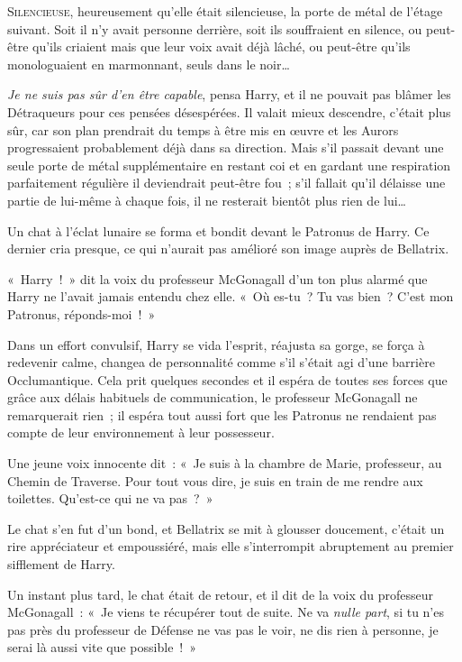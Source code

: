 
\lettrine{S}{ilencieuse}, heureusement qu'elle était silencieuse, la porte de métal de l'étage suivant. Soit il n'y avait personne derrière, soit ils souffraient en silence, ou peut-être qu'ils criaient mais que leur voix avait déjà lâché, ou peut-être qu'ils monologuaient en marmonnant, seuls dans le noir…

\emph{Je ne suis pas sûr d'en être capable}, pensa Harry, et il ne pouvait pas blâmer les Détraqueurs pour ces pensées désespérées. Il valait mieux descendre, c'était plus sûr, car son plan prendrait du temps à être mis en œuvre et les Aurors progressaient probablement déjà dans sa direction. Mais s'il passait devant une seule porte de métal supplémentaire en restant coi et en gardant une respiration parfaitement régulière il deviendrait peut-être fou~; s'il fallait qu'il délaisse une partie de lui-même à chaque fois, il ne resterait bientôt plus rien de lui…

Un chat à l'éclat lunaire se forma et bondit devant le Patronus de Harry. Ce dernier cria presque, ce qui n'aurait pas amélioré son image auprès de Bellatrix.

«~Harry~!~» dit la voix du professeur McGonagall d'un ton plus alarmé que Harry ne l'avait jamais entendu chez elle. «~Où es-tu~? Tu vas bien~? C'est mon Patronus, réponds-moi~!~»

Dans un effort convulsif, Harry se vida l'esprit, réajusta sa gorge, se força à redevenir calme, changea de personnalité comme s'il s'était agi d'une barrière Occlumantique. Cela prit quelques secondes et il espéra de toutes ses forces que grâce aux délais habituels de communication, le professeur McGonagall ne remarquerait rien~; il espéra tout aussi fort que les Patronus ne rendaient pas compte de leur environnement à leur possesseur.

Une jeune voix innocente dit~: «~Je suis à la chambre de Marie, professeur, au Chemin de Traverse. Pour tout vous dire, je suis en train de me rendre aux toilettes. Qu'est-ce qui ne va pas~?~»

Le chat s'en fut d'un bond, et Bellatrix se mit à glousser doucement, c'était un rire appréciateur et empoussiéré, mais elle s'interrompit abruptement au premier sifflement de Harry.

Un instant plus tard, le chat était de retour, et il dit de la voix du professeur McGonagall~: «~Je viens te récupérer tout de suite. Ne va \emph{nulle part}, si tu n'es pas près du professeur de Défense ne vas pas le voir, ne dis rien à personne, je serai là aussi vite que possible~!~»

